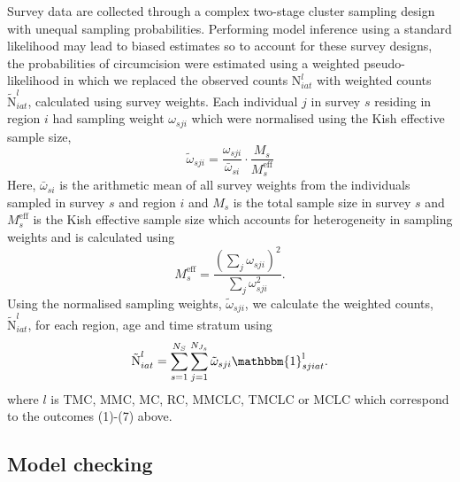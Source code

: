 \documentclass{article}
\begin{document}
\begin{appendix}
\noindent Survey data are collected through a complex two-stage cluster sampling design with unequal sampling probabilities. Performing model inference using a standard likelihood may lead to biased estimates so to account for these survey designs, the probabilities of circumcision were estimated using a weighted pseudo-likelihood in which we replaced the observed counts $\text{N}^l_{iat}$ with weighted counts $\tilde{\text{N}}^l_{iat}$, calculated using survey weights. Each individual $j$ in survey $s$ residing in region $i$ had sampling weight $\omega_{sji}$ which were normalised using the Kish effective sample size, 
\begin{equation*}
	\tilde\omega_{sji} = \frac{\omega_{sji}}{\bar{\omega}_{si}}\cdot \frac{M_s}{M^{\text{eff}}_s} 
\end{equation*}
Here, $\bar{\omega}_{si}$ is the arithmetic mean of all survey weights from the individuals sampled in survey $s$ and region $i$ and $M_s$ is the total sample size in survey $s$ and $M^{\text{eff}}_s$ is the Kish effective sample size which accounts for heterogeneity in sampling weights and is calculated using 
\begin{equation*}
	M^{\text{eff}}_s = \frac{(\sum_j \omega_{sji})^2}{\sum_j \omega_{sji}^{2}}.
\end{equation*}
Using the normalised sampling weights, $\tilde\omega_{sji}$, we calculate the weighted counts, $\tilde{\text{N}}^l_{iat}$, for each region, age and time stratum using 
\begin{equation*}
	\tilde{\text{N}}^{l}_{iat} = \sum_{s=1}^{N_S}\sum_{j=1}^{N_{J_s}}\tilde\omega_{sji} \mathbbm{1}^{\text{l}}_{sjiat}.
\end{equation*}
where $l$ is TMC, MMC, MC, RC, MMCLC, TMCLC or MCLC which correspond to the outcomes (1)-(7) above. 


\subsection{Model checking}
\label{sec::modelcheck}






\end{appendix}
\end{document}
